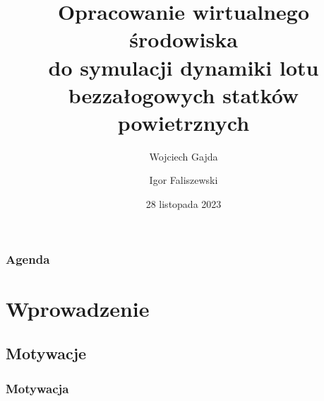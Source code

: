 \documentclass[aspectratio=169]{beamer}
\title{Opracowanie wirtualnego środowiska\\do symulacji dynamiki lotu\\ bezzałogowych statków powietrznych}
\author{Wojciech Gajda \and  Igor Faliszewski}
\date{28 listopada 2023} %
\begin{document}
\sloppy

{
\maketitleframe 
}

\begin{frame}
\frametitle{Agenda}
  \tableofcontents[  
    sectionstyle=show, 
    ]
\end{frame}

\section{Wprowadzenie}
\subsection{Motywacje}
\begin{frame}%
	\frametitle{Motywacja}
	\begin{columns}
		\begin{column}{0.33\textwidth}
			\begin{figure}
	   		 \centering
	    		\end{figure}
	    		\begin{figure}
	   		 \centering
	    		\end{figure}
			\begin{figure}
	   		 \centering

\end{figure}
\end{column}
\end{columns}
\end{frame}
\end{document}
